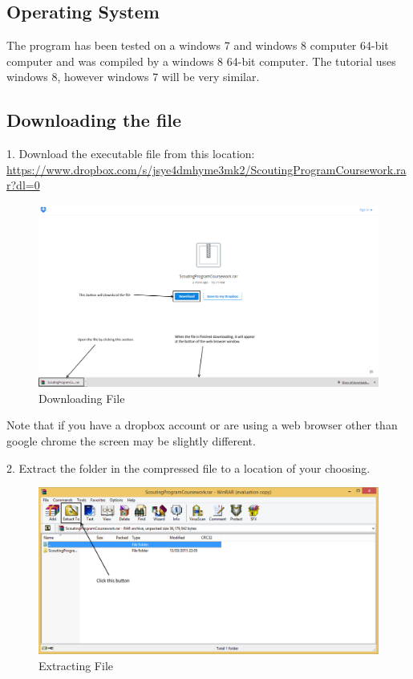 \subsection{Operating System}
The program has been tested on a windows 7 and windows 8 computer 64-bit computer and was compiled by a windows 8 64-bit computer. The tutorial uses windows 8, however windows 7 will be very similar.

\subsection{Downloading the file}

1. Download the executable file from this location: \url{https://www.dropbox.com/s/jsye4dmhyme3mk2/ScoutingProgramCoursework.rar?dl=0}

\begin{figure}[H]
	\includegraphics[width=\textwidth]{./Manual/Images/DownloadingFile.png}
	\caption{Downloading File} \label{fig:download_file}
\end{figure}

Note that if you have a dropbox account or are using a web browser other than google chrome the screen may be slightly different.


2. Extract the folder in the compressed file to a location of your choosing.

\begin{figure}[H]
	\includegraphics[width=\textwidth]{./Manual/Images/Extracting1.png}
	\caption{Extracting File} \label{fig:extracting_file_1}
\end{figure}

